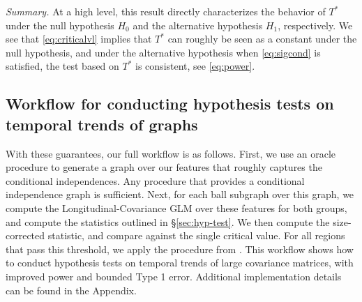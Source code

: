{\em Summary.}
At a high level, this result directly characterizes the behavior of $T^*$ under the null hypothesis $H_0$ and 
the alternative hypothesis $H_1$, respectively. 
We see that \eqref{eq:criticalvl} implies that $T^*$ can roughly be seen as a constant under the null hypothesis, 
and under the alternative hypothesis when \eqref{eq:sigcond} is satisfied, the test based on $T^*$ is consistent, see \eqref{eq:power}. 

\subsection{Workflow for conducting hypothesis tests on temporal trends of graphs}
With these guarantees, our full workflow is as follows. First, we use an oracle procedure to generate a graph over our features 
that roughly captures the conditional independences. Any procedure that provides a conditional independence graph is sufficient. 
Next, for each ball subgraph over this graph, we compute the Longitudinal-Covariance GLM over these features for both groups, and compute the statistics outlined in \S\ref{sec:hyp-test}. We then compute the size-corrected statistic, and compare against the single critical value. For all regions that pass this threshold, we apply the procedure from \cite{jeng2010optimal}. This workflow shows how to conduct hypothesis tests on temporal trends of large covariance matrices, with improved 
power and bounded Type 1 error. Additional implementation details can be found in the Appendix.
